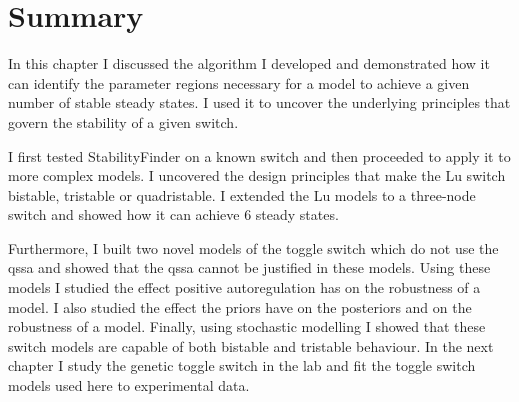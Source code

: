 \section{Summary}

In this chapter I discussed the algorithm I developed and demonstrated how it can identify the parameter regions necessary for a model to achieve a given number of stable steady states. I used it to uncover the underlying principles that govern the stability of a given switch. 

I first tested StabilityFinder on a known switch and then proceeded to apply it to more complex models. I uncovered the design principles that make the Lu switch bistable, tristable or quadristable. I extended the Lu models to a three-node switch and showed how it can achieve 6 steady states. 

Furthermore, I built two novel models of the toggle switch which do not use the \acrshort{qssa} and showed that the \acrshort{qssa} cannot be justified in these models. Using these models I studied the effect positive autoregulation has on the robustness of a model. I also studied the effect the priors have on the posteriors and on the robustness of a model. Finally, using stochastic modelling I showed that these switch models are capable of both bistable and tristable behaviour. In the next chapter I study the genetic toggle switch in the lab and fit the toggle switch models used here to experimental data. 




